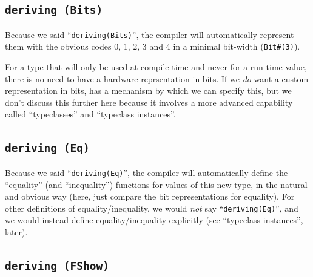 
\subsection{{\tt deriving (Bits)}}

\label{Sec_deriving_Bits}


Because we said ``\verb|deriving(Bits)|'', the {\bsc} compiler
will automatically represent them with the obvious codes 0, 1, 2, 3
and 4 in a minimal bit-width (\verb|Bit#(3)|).

For a type that will only be used at compile time and never for a
run-time value, there is no need to have a hardware reprsentation in
bits.  If we \emph{do} want a custom representation in bits, {\BSV}
has a mechanism by which we can specify this, but we don't discuss
this further here because it involves a more advanced {\BSV}
capability called ``typeclasses'' and ``typeclass instances''.


\subsection{{\tt deriving (Eq)}}

\label{Sec_deriving_Eq}


Because we said ``\verb|deriving(Eq)|'', the {\bsc} compiler will
automatically define the ``equality'' (and ``inequality'') functions
for values of this new type, in the natural and obvious way (here,
just compare the bit representations for equality).  For other
definitions of equality/inequality, we would \emph{not} say
``\verb|deriving(Eq)|'', and we would instead define
equality/inequality explicitly (see ``typeclass instances'', later).


\subsection{{\tt deriving (FShow)}}

\label{Sec_deriving_FShow}

